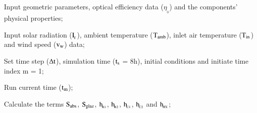 


\begin{description}[before={\setcounter{descriptcount}{0}},font=\bfseries\stepcounter{descriptcount}\thedescriptcount~]
	\item Input geometric parameters, optical efficiency data ($\eta_{\!_{0}}$) and the components' physical properties;
	\item Input solar radiation ($\rm{I_{\!_T}}$), ambient temperature ($\rm{T_{amb}}$), inlet air temperature ($\rm{T_{in}}$) and wind speed ($\rm{v_w}$) data;
	\item Set time step ($\Delta \rm{t}$), simulation time ($\rm{t_{s}}$ = 8h), initial conditions and initiate time index m = 1;
	\item Run current time ($\rm{t_m}$);
	\item Calculate the terms $\rm{S_{abs}}$, $\rm{S_{glaz}}$, $\rm{h_{\!_{R1}}}$, $\rm{h_{\!_{R2}}}$, $\rm{h_{\!_{C1}}}$, $\rm{h_{\!_{C2}}}$ and $\rm{h_{\!_{HX}}}$;

\end{description}
